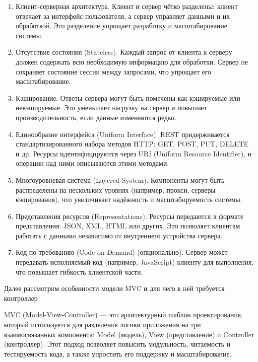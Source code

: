\documentclass[pract]{SCWorks}
\begin{document}
\begin{enumerate}
    \item Клиент-серверная архитектура.
    Клиент и сервер чётко разделены: клиент отвечает за интерфейс 
    пользователя, а сервер управляет данными и их обработкой. Это 
    разделение упрощает разработку и масштабирование системы.

    \item Отсутствие состояния (Stateless).
    Каждый запрос от клиента к серверу должен содержать всю необходимую 
    информацию для обработки. Сервер не сохраняет состояние сессии между 
    запросами, что упрощает его масштабирование.

    \item Кэширование.
    Ответы сервера могут быть помечены как кэшируемые или некэшируемые. 
    Это уменьшает нагрузку на сервер и повышает производительность, если 
    данные изменяются редко.

    \item Единообразие интерфейса (Uniform Interface).
    REST придерживается стандартизированного набора методов HTTP: GET, POST, 
    PUT, DELETE и др. Ресурсы идентифицируются через URI (Uniform Resource 
    Identifier), и операции над ними описываются этими методами.

    \item Многоуровневая система (Layered System).
    Компоненты могут быть распределены на нескольких уровнях (например, 
    прокси, серверы кэширования), что увеличивает надёжность и 
    масштабируемость системы.

    \item Представления ресурсов (Representations).
    Ресурсы передаются в формате представления: JSON, XML, HTML или других. 
    Это позволяет клиентам работать с данными независимо от внутреннего 
    устройства сервера.

    \item Код по требованию (Code-on-Demand) (опционально).
    Сервер может передавать исполняемый код (например, JavaScript) клиенту 
    для выполнения, что повышает гибкость клиентской части.
\end{enumerate}

Далее рассмотрим особенности модели MVC и для чего в ней требуется контроллер

MVC (Model-View-Controller) — это архитектурный шаблон проектирования, который 
используется для разделения логики приложения на три взаимосвязанных 
компонента: Model (модель), View (представление) и Controller (контроллер). 
Этот подход позволяет повысить модульность, читаемость и тестируемость кода, 
а также упростить его поддержку и масштабирование.
\end{document}
